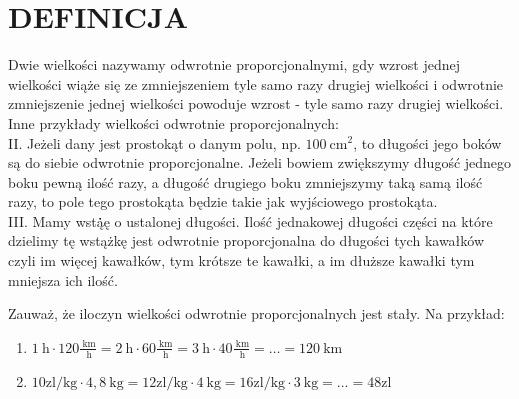 \documentclass[10pt]{article}
\begin{document}
\section*{DEFINICJA}
Dwie wielkości nazywamy odwrotnie proporcjonalnymi, gdy wzrost jednej wielkości wiąże się ze zmniejszeniem tyle samo razy drugiej wielkości i odwrotnie zmniejszenie jednej wielkości powoduje wzrost - tyle samo razy drugiej wielkości.\\
Inne przykłady wielkości odwrotnie proporcjonalnych:\\
II. Jeżeli dany jest prostokąt o danym polu, np. \(100 \mathrm{~cm}^{2}\), to długości jego boków są do siebie odwrotnie proporcjonalne. Jeżeli bowiem zwiększymy długość jednego boku pewną ilość razy, a długość drugiego boku zmniejszymy taką samą ilość razy, to pole tego prostokąta będzie takie jak wyjściowego prostokąta.\\
III. Mamy wstą̇̇̇ę o ustalonej długości. Ilość jednakowej długości części na które dzielimy tę wstążkę jest odwrotnie proporcjonalna do długości tych kawałków czyli im więcej kawałków, tym krótsze te kawałki, a im dłuższe kawałki tym mniejsza ich ilość.

Zauważ, że iloczyn wielkości odwrotnie proporcjonalnych jest stały. Na przykład:

\begin{enumerate}
  \item \(1 \mathrm{~h} \cdot 120 \frac{\mathrm{~km}}{\mathrm{~h}}=2 \mathrm{~h} \cdot 60 \frac{\mathrm{~km}}{\mathrm{~h}}=3 \mathrm{~h} \cdot 40 \frac{\mathrm{~km}}{\mathrm{~h}}=\ldots=120 \mathrm{~km}\)
  \item \(10 \mathrm{zl} / \mathrm{kg} \cdot 4,8 \mathrm{~kg}=12 \mathrm{zl} / \mathrm{kg} \cdot 4 \mathrm{~kg}=16 \mathrm{zl} / \mathrm{kg} \cdot 3 \mathrm{~kg}=\ldots=48 \mathrm{zl}\)
\end{enumerate}
\end{document}
